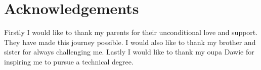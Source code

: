 \chapter*{Acknowledgements}
\makeatletter{}\makeatother

Firstly I would like to thank my parents for their unconditional love and support. They have made this journey possible. I would also like to thank my brother and sister for always challenging me. Lastly I would like to thank my oupa Dawie for inspiring me to pursue a technical degree. 